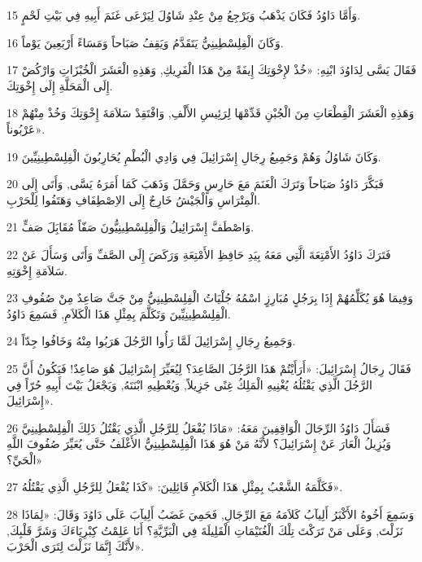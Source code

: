 \par 15 وَأَمَّا دَاوُدُ فَكَانَ يَذْهَبُ وَيَرْجِعُ مِنْ عِنْدِ شَاوُلَ لِيَرْعَى غَنَمَ أَبِيهِ فِي بَيْتِ لَحْمٍ.
\par 16 وَكَانَ الْفِلِسْطِينِيُّ يَتَقَدَّمُ وَيَقِفُ صَبَاحاً وَمَسَاءً أَرْبَعِينَ يَوْماً.
\par 17 فَقَالَ يَسَّى لِدَاوُدَ ابْنِهِ: «خُذْ لإِخْوَتِكَ إِيفَةً مِنْ هَذَا الْفَرِيكِ, وَهَذِهِ الْعَشَرَ الْخُبْزَاتِ وَارْكُضْ إِلَى الْمَحَلَّةِ إِلَى إِخْوَتِكَ.
\par 18 وَهَذِهِ الْعَشَرَ الْقِطْعَاتِ مِنَ الْجُبْنِ قَدِّمْهَا لِرَئِيسِ الأَلْفِ, وَافْتَقِدْ سَلاَمَةَ إِخْوَتِكَ وَخُذْ مِنْهُمْ عَرْبُوناً».
\par 19 وَكَانَ شَاوُلُ وَهُمْ وَجَمِيعُ رِجَالِ إِسْرَائِيلَ فِي وَادِي الْبُطْمِ يُحَارِبُونَ الْفِلِسْطِينِيِّينَ.
\par 20 فَبَكَّرَ دَاوُدُ صَبَاحاً وَتَرَكَ الْغَنَمَ مَعَ حَارِسٍ وَحَمَّلَ وَذَهَبَ كَمَا أَمَرَهُ يَسَّى, وَأَتَى إِلَى الْمِتْرَاسِ وَالْجَيْشُ خَارِجٌ إِلَى الاِصْطِفَافِ وَهَتَفُوا لِلْحَرْبِ.
\par 21 وَاصْطَفَّ إِسْرَائِيلُ وَالْفِلِسْطِينِيُّونَ صَفّاً مُقَابَِلَ صَفٍّ.
\par 22 فَتَرَكَ دَاوُدُ الأَمْتِعَةَ الَّتِي مَعَهُ بِيَدِ حَافِظِ الأَمْتِعَةِ وَرَكَضَ إِلَى الصَّفِّ وَأَتَى وَسَأَلَ عَنْ سَلاَمَةِ إِخْوَتِهِ.
\par 23 وَفِيمَا هُوَ يُكَلِّمُهُمْ إِذَا بِرَجُلٍ مُبَارِزٍ اسْمُهُ جُلْيَاتُ الْفِلِسْطِينِيُّ مِنْ جَتَّ صَاعِدٌ مِنْ صُفُوفِ الْفِلِسْطِينِيِّينَ وَتَكَلَّمَ بِمِثْلِ هَذَا الْكَلاَمِ, فَسَمِعَ دَاوُدُ.
\par 24 وَجَمِيعُ رِجَالِ إِسْرَائِيلَ لَمَّا رَأُوا الرَّجُلَ هَرَبُوا مِنْهُ وَخَافُوا جِدّاً.
\par 25 فَقَالَ رِجَالُ إِسْرَائِيلَ: «أَرَأَيْتُمْ هَذَا الرَّجُلَ الصَّاعِدَ؟ لِيُعَيِّرَ إِسْرَائِيلَ هُوَ صَاعِدٌ! فَيَكُونُ أَنَّ الرَّجُلَ الَّذِي يَقْتُلُهُ يُغْنِيهِ الْمَلِكُ غِنًى جَزِيلاً, وَيُعْطِيهِ ابْنَتَهُ, وَيَجْعَلُ بَيْتَ أَبِيهِ حُرّاً فِي إِسْرَائِيلَ».
\par 26 فَسَأَلَ دَاوُدُ الرِّجَالَ الْوَاقِفِينَ مَعَهُ: «مَاذَا يُفْعَلُ لِلرَّجُلِ الَّذِي يَقْتُلُ ذَلِكَ الْفِلِسْطِينِيَّ وَيُزِيلُ الْعَارَ عَنْ إِسْرَائِيلَ؟ لأَنَّهُ مَنْ هُوَ هَذَا الْفِلِسْطِينِيُّ الأَغْلَفُ حَتَّى يُعَيِّرَ صُفُوفَ اللَّهِ الْحَيِّ؟»
\par 27 فَكَلَّمَهُ الشَّعْبُ بِمِثْلِ هَذَا الْكَلاَمِ قَائِلِينَ: «كَذَا يُفْعَلُ لِلرَّجُلِ الَّذِي يَقْتُلُهُ».
\par 28 وَسَمِعَ أَخُوهُ الأَكْبَرُ أَلِيآبُ كَلاَمَهُ مَعَ الرِّجَالِ, فَحَمِيَ غَضَبُ أَلِيآبَ عَلَى دَاوُدَ وَقَالَ: «لِمَاذَا نَزَلْتَ, وَعَلَى مَنْ تَرَكْتَ تِلْكَ الْغُنَيْمَاتِ الْقَلِيلَةَ فِي الْبَرِّيَّةِ؟ أَنَا عَلِمْتُ كِبْرِيَاءَكَ وَشَرَّ قَلْبِكَ, لأَنَّكَ إِنَّمَا نَزَلْتَ لِتَرَى الْحَرْبَ».
